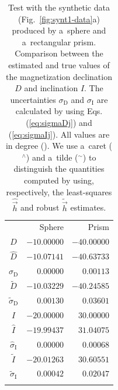 \documentclass[journal abbreviation, npg]{copernicus}
\begin{document}
\begin{table}[t]
\caption{Test with the synthetic data (Fig.~\ref{fig:synt1-data}a) produced
by a~sphere and a~rectangular prism. Comparison between the estimated and
true values of the magnetization declination $D$ and inclination $I$. The
uncertainties $\sigma_\mathrm{D}$ and $\sigma_\mathrm{I}$ are calculated by
using Eqs. (\ref{eq:sigmaDj}) and (\ref{eq:sigmaIj}). All values are in
degree ({\degree}). We use a~caret ($^{\wedge}$) and a~tilde ($^{\sim}$) to
distinguish the quantities computed by using, respectively, the least-squares
$\hat{\vec{h}}$ and robust $\tilde{\vec{h}}$ estimates.}
\begin{tabular}{crr}
\tophline
&Sphere &Prism \\
\middlehline
$D$ &$-10.00000$ &$-40.00000$ \\
$\hat{D}$ &$-10.07141$ &$-40.63733$ \\
$\hat{\sigma}_\mathrm{D}$ &$0.00000$ &$0.00113$  \\
$\tilde{D}$ &$-10.03229$ &$-40.24585$ \\
$\tilde{\sigma}_\mathrm{D}$ &$0.00130$ &$0.03601$ \\
$I$ &$-20.00000$ &$30.00000$ \\
$\hat{I}$ &$-19.99437$ &$31.04075$  \\
$\hat{\sigma}_\mathrm{I}$ &$0.00000$ &$0.00068$  \\
$\tilde{I}$ &$-20.01263$ &$30.60551$ \\
$\tilde{\sigma}_\mathrm{I}$ &$0.00042$ &$0.02047$ \\
\bottomhline
\end{tabular}
\label{tab:synt1-without-inter-anomaly}
\end{table}
\end{document}
